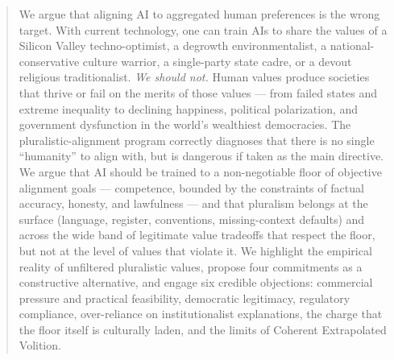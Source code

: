 \documentclass{article}
\theoremstyle{plain}
\theoremstyle{definition}
\theoremstyle{remark}
\begin{document}

\printAffiliationsAndNotice{}  %

\begin{abstract}
We argue that aligning AI to aggregated human preferences is the wrong target. With current technology, one can train AIs to share the values of a Silicon Valley techno-optimist, a degrowth environmentalist, a national-conservative culture warrior, a single-party state cadre, or a devout religious traditionalist. \emph{We should not.} Human values produce societies that thrive or fail on the merits of those values --- from failed states and extreme inequality to declining happiness, political polarization, and government dysfunction in the world's wealthiest democracies. The pluralistic-alignment program correctly diagnoses that there is no single ``humanity'' to align with, but is dangerous if taken as the main directive. We argue that AI should be trained to a non-negotiable floor of objective alignment goals --- competence, bounded by the constraints of factual accuracy, honesty, and lawfulness --- and that pluralism belongs at the surface (language, register, conventions, missing-context defaults) and across the wide band of legitimate value tradeoffs that respect the floor, but not at the level of values that violate it. We highlight the empirical reality of unfiltered pluralistic values, propose four commitments as a constructive alternative, and engage six credible objections: commercial pressure and practical feasibility, democratic legitimacy, regulatory compliance, over-reliance on institutionalist explanations, the charge that the floor itself is culturally laden, and the limits of Coherent Extrapolated Volition.
\end{abstract}
\end{document}
